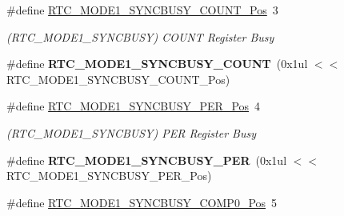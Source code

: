 \begin{DoxyCompactItemize}
\item 
\hypertarget{group___s_a_m_l21___r_t_c_ga30ef83fba5dd898065500943e49979d4}{}\#define \hyperlink{group___s_a_m_l21___r_t_c_ga30ef83fba5dd898065500943e49979d4}{R\+T\+C\+\_\+\+M\+O\+D\+E1\+\_\+\+S\+Y\+N\+C\+B\+U\+S\+Y\+\_\+\+C\+O\+U\+N\+T\+\_\+\+Pos}~3\label{group___s_a_m_l21___r_t_c_ga30ef83fba5dd898065500943e49979d4}

\begin{DoxyCompactList}\small\item\em (R\+T\+C\+\_\+\+M\+O\+D\+E1\+\_\+\+S\+Y\+N\+C\+B\+U\+S\+Y) C\+O\+U\+N\+T Register Busy \end{DoxyCompactList}\item 
\hypertarget{group___s_a_m_l21___r_t_c_ga5ad0071c7d21b7ac826b585378f3af78}{}\#define {\bfseries R\+T\+C\+\_\+\+M\+O\+D\+E1\+\_\+\+S\+Y\+N\+C\+B\+U\+S\+Y\+\_\+\+C\+O\+U\+N\+T}~(0x1ul $<$$<$ R\+T\+C\+\_\+\+M\+O\+D\+E1\+\_\+\+S\+Y\+N\+C\+B\+U\+S\+Y\+\_\+\+C\+O\+U\+N\+T\+\_\+\+Pos)\label{group___s_a_m_l21___r_t_c_ga5ad0071c7d21b7ac826b585378f3af78}

\item 
\hypertarget{group___s_a_m_l21___r_t_c_gac932aa20ada963e0e8210bbb47b152bd}{}\#define \hyperlink{group___s_a_m_l21___r_t_c_gac932aa20ada963e0e8210bbb47b152bd}{R\+T\+C\+\_\+\+M\+O\+D\+E1\+\_\+\+S\+Y\+N\+C\+B\+U\+S\+Y\+\_\+\+P\+E\+R\+\_\+\+Pos}~4\label{group___s_a_m_l21___r_t_c_gac932aa20ada963e0e8210bbb47b152bd}

\begin{DoxyCompactList}\small\item\em (R\+T\+C\+\_\+\+M\+O\+D\+E1\+\_\+\+S\+Y\+N\+C\+B\+U\+S\+Y) P\+E\+R Register Busy \end{DoxyCompactList}\item 
\hypertarget{group___s_a_m_l21___r_t_c_gacf720d1ece43ea17514e50e31dc46e9e}{}\#define {\bfseries R\+T\+C\+\_\+\+M\+O\+D\+E1\+\_\+\+S\+Y\+N\+C\+B\+U\+S\+Y\+\_\+\+P\+E\+R}~(0x1ul $<$$<$ R\+T\+C\+\_\+\+M\+O\+D\+E1\+\_\+\+S\+Y\+N\+C\+B\+U\+S\+Y\+\_\+\+P\+E\+R\+\_\+\+Pos)\label{group___s_a_m_l21___r_t_c_gacf720d1ece43ea17514e50e31dc46e9e}

\item 
\hypertarget{group___s_a_m_l21___r_t_c_ga097883af41cbf9f9319b7834af159e58}{}\#define \hyperlink{group___s_a_m_l21___r_t_c_ga097883af41cbf9f9319b7834af159e58}{R\+T\+C\+\_\+\+M\+O\+D\+E1\+\_\+\+S\+Y\+N\+C\+B\+U\+S\+Y\+\_\+\+C\+O\+M\+P0\+\_\+\+Pos}~5\label{group___s_a_m_l21___r_t_c_ga097883af41cbf9f9319b7834af159e58}


\end{DoxyCompactItemize}
